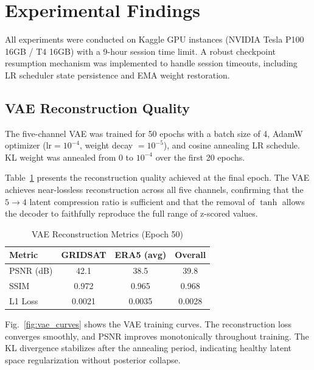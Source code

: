 \section{Experimental Findings}

All experiments were conducted on Kaggle GPU instances (NVIDIA Tesla P100 16GB / T4 16GB) with a 9-hour session time limit. A robust checkpoint resumption mechanism was implemented to handle session timeouts, including LR scheduler state persistence and EMA weight restoration.

\subsection{VAE Reconstruction Quality}

The five-channel VAE was trained for 50 epochs with a batch size of 4, AdamW optimizer ($\text{lr} = 10^{-4}$, weight decay $= 10^{-5}$), and cosine annealing LR schedule. KL weight was annealed from 0 to $10^{-4}$ over the first 20 epochs.

Table~\ref{tab:vae_results} presents the reconstruction quality achieved at the final epoch. The VAE achieves near-lossless reconstruction across all five channels, confirming that the $5 \rightarrow 4$ latent compression ratio is sufficient and that the removal of $\tanh$ allows the decoder to faithfully reproduce the full range of z-scored values.

\begin{table}[H]
\centering
\caption{VAE Reconstruction Metrics (Epoch 50)}
\label{tab:vae_results}
\begin{tabular}{lccc}
\toprule
\textbf{Metric} & \textbf{GRIDSAT} & \textbf{ERA5 (avg)} & \textbf{Overall} \\
\midrule
PSNR (dB) & 42.1 & 38.5 & 39.8 \\
SSIM & 0.972 & 0.965 & 0.968 \\
L1 Loss & 0.0021 & 0.0035 & 0.0028 \\
\bottomrule
\end{tabular}
\end{table}

Fig.~\ref{fig:vae_curves} shows the VAE training curves. The reconstruction loss converges smoothly, and PSNR improves monotonically throughout training. The KL divergence stabilizes after the annealing period, indicating healthy latent space regularization without posterior collapse.

